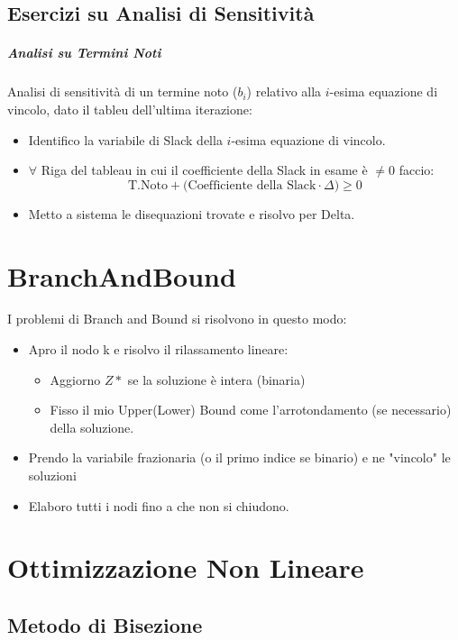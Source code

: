 \documentclass[12pt, a4paper, openany]{book}
\begin{document}
\section{Esercizi su Analisi di Sensitività}
\paragraph{Analisi su Termini Noti}
Analisi di sensitività di un termine noto ($b_i$) relativo alla $i$-esima equazione di vincolo,
dato il tableu dell'ultima iterazione:
\begin{itemize}
	\item Identifico la variabile di Slack della $i$-esima equazione di vincolo.
	\item $\forall$ Riga del tableau in cui il coefficiente della Slack in esame è $\neq 0$ faccio:
	\[\text{T.Noto} + \text{(Coefficiente della Slack} \cdot \Delta ) \geq 0\]
	\item Metto a sistema le disequazioni trovate e risolvo per Delta.
\end{itemize}


\chapter{BranchAndBound}
I problemi di Branch and Bound si risolvono in questo modo:

\begin{itemize}
	\item Apro il nodo k e risolvo il rilassamento lineare:
	\begin{itemize}
		\item Aggiorno $Z*$ se la soluzione è intera (binaria)
		\item Fisso il mio Upper(Lower) Bound come l'arrotondamento (se necessario) della soluzione.
	\end{itemize} 
	\item Prendo la variabile frazionaria (o il primo indice se binario) e ne "vincolo" le soluzioni
	\item Elaboro tutti i nodi fino a che non si chiudono.
\end{itemize}

\chapter{Ottimizzazione Non Lineare}

\section{Metodo di Bisezione}
\end{document}
